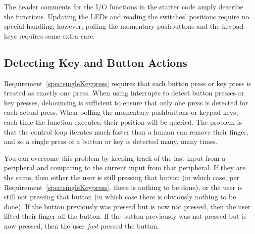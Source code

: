 The header comments for the I/O functions in the starter code amply describe the functions.
Updating the LEDs and reading the switches' positions require no special handling;
however, polling the momentary pushbuttons and the keypad keys requires some extra care.

\subsection{Detecting Key and Button Actions}

Requirement~\ref{spec:singleKeypress} requires that each button press or key press is treated as exactly one press.
When using interrupts to detect button presses or key presses, debouncing is sufficient to ensure that only one press is detected for each actual press.
When polling the momentary pushbuttons or keypad keys, each time the  function executes, their position will be queried.
The problem is that the control loop iterates much faster than a human can remove their finger, and so a single press of a button or key is detected many, many times.

%

You can overcome this problem by keeping track of the last input from a peripheral and comparing to the current input from that peripheral.
If they are the same, then either the user is still pressing that button (in which case, per Requirement~\ref{spec:singleKeypress}, there is nothing to be done), or the user is still not pressing that button (in which case there is obviously nothing to be done).
If the button previously was pressed but is now not pressed, then the user lifted their finger off the button.
If the button previously was not pressed but is now pressed, then the user \textit{just} pressed the button.

